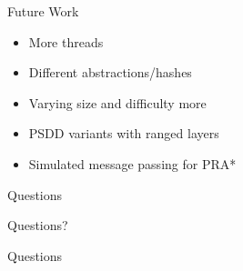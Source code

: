 \documentclass[style=unh]{powerdot}
\begin{document}
\begin{slide}{Future Work}
  \begin{itemize}
  \item More threads
  \item Different abstractions/hashes
  \item Varying size and difficulty more
  \item PSDD variants with ranged layers
  \item Simulated message passing for PRA*
  \end{itemize}
\end{slide}


\begin{slide}{Questions}
  \begin{center}
    Questions?
  \end{center}
\end{slide}{Questions}

\end{document}
